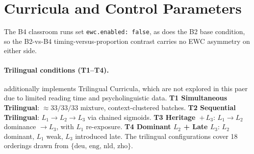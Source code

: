  
\section{\beetle{} Curricula and Control Parameters}\label{sec:beetle-curricula}
 
 
The B4 classroom runs set \texttt{ewc.enabled: false}, as does the B2 base condition, so the B2-vs-B4 timing-versus-proportion contrast carries no EWC asymmetry on either side.
 
\paragraph{Trilingual conditions (T1--T4).}  \beetle{} additionally implements Trilingual Curricula, which are not explored in this paer due to limited reading time and psycholinguistic data. \textbf{T1 Simultaneous Trilingual}: ${\approx}33/33/33$ mixture, context-clustered batches. \textbf{T2 Sequential Trilingual}: $L_1\to L_2\to L_3$ via chained sigmoids. \textbf{T3 Heritage~$+\,L_3$}: $L_1\to L_2$ dominance $\to L_3$, with $L_1$ re-exposure. \textbf{T4 Dominant $L_2$ + Late $L_3$}: $L_2$ dominant, $L_1$ weak, $L_3$ introduced late. The trilingual configurations cover 18 orderings drawn from $\{\text{deu, eng, nld, zho}\}$.
 

